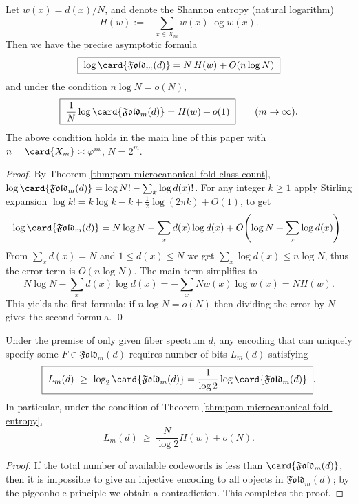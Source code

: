 \begin{theorem}\label{thm:pom-microcanonical-fold-entropy}
Let \(w(x)=d(x)/N\), and denote the Shannon entropy (natural logarithm)
\[
H(w):=-\sum_{x\in X_m} w(x)\log w(x).
\]
Then we have the precise asymptotic formula
\[
\boxed{\;
\log\card{\mathfrak{Fold}_m(d)}=N\,H(w)+O(n\log N)\;}
\]
and under the condition \(n\log N=o(N)\),
\[
\boxed{\;
\frac{1}{N}\log\card{\mathfrak{Fold}_m(d)}=H(w)+o(1)\;}
\qquad(m\to\infty).
\]
The above condition holds in the main line of this paper with \(n=\card{X_m}\asymp \varphi^m\), \(N=2^m\).
\end{theorem}
\begin{proof}
By Theorem \ref{thm:pom-microcanonical-fold-class-count},
\(
\log\card{\mathfrak{Fold}_m(d)}=\log N!-\sum_x\log d(x)!
\).
For any integer \(k\ge 1\) apply Stirling expansion
\(
\log k!=k\log k-k+\tfrac12\log(2\pi k)+O(1)
\),
to get
\[
\log\card{\mathfrak{Fold}_m(d)}
=N\log N-\sum_x d(x)\log d(x)+O\!\left(\log N+\sum_x\log d(x)\right).
\]
From \(\sum_x d(x)=N\) and \(1\le d(x)\le N\) we get \(\sum_x\log d(x)\le n\log N\), thus the error term is \(O(n\log N)\).
The main term simplifies to
\[
N\log N-\sum_x d(x)\log d(x)
=-\sum_x Nw(x)\log w(x)
=N H(w).
\]
This yields the first formula; if \(n\log N=o(N)\) then dividing the error by \(N\) gives the second formula. \qed
\end{proof}

\begin{corollary}\label{cor:pom-microcanonical-fold-description-length-lower-bound}
Under the premise of only given fiber spectrum \(d\), any encoding that can uniquely specify some \(F\in\mathfrak{Fold}_m(d)\) requires number of bits \(L_m(d)\) satisfying
\[
\boxed{\;
L_m(d)\ \ge\ \log_2\card{\mathfrak{Fold}_m(d)}
=\frac{1}{\log 2}\log\card{\mathfrak{Fold}_m(d)}\; } .
\]
In particular, under the condition of Theorem \ref{thm:pom-microcanonical-fold-entropy},
\[
L_m(d)\ \ge\ \frac{N}{\log 2}H(w)+o(N).
\]
\end{corollary}
\begin{proof}
If the total number of available codewords is less than \(\card{\mathfrak{Fold}_m(d)}\), then it is impossible to give an injective encoding to all objects in \(\mathfrak{Fold}_m(d)\); by the pigeonhole principle we obtain a contradiction. This completes the proof.
\end{proof}


